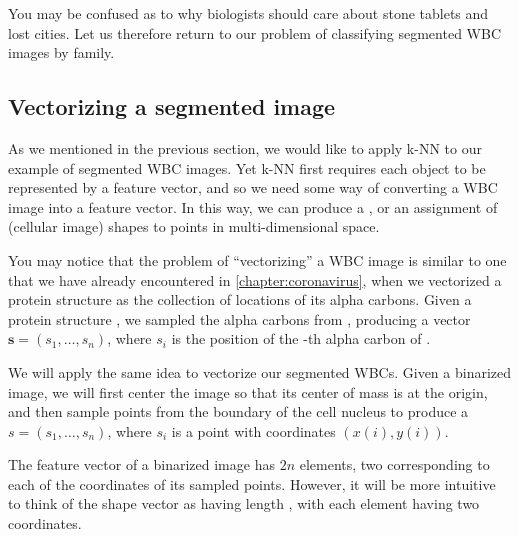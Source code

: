 You may be confused as to why biologists should care about stone tablets and lost cities. Let us therefore return to our problem of classifying segmented WBC images by family.

\FloatBarrier
{}
\subsection{Vectorizing a segmented image}

As we mentioned in the previous section, we would like to apply k-NN to our example of segmented WBC images. Yet k-NN first requires each object to be represented by a feature vector, and so we need some way of converting a WBC image into a feature vector. In this way, we can produce a , or an assignment of (cellular image) shapes to points in multi-dimensional space.

You may notice that the problem of ``vectorizing'' a WBC image is similar to one that we have already encountered in \autoref{chapter:coronavirus}, when we vectorized a protein structure as the collection of locations of its alpha carbons. Given a protein structure , we sampled the  alpha carbons from , producing a vector $\mathbf{s} = (s_1, \ldots, s_n)$, where $s_i$ is the position of the -th alpha carbon of .

We will apply the same idea to vectorize our segmented WBCs. Given a binarized image, we will first center the image so that its center of mass is at the origin, and then sample  points from the boundary of the cell nucleus to produce a  $s = (s_1, \ldots, s_n)$, where $s_i$ is a point with coordinates $(x(i), y(i))$.\\

\begin{note}\end{note}

The feature vector of a binarized image has $2n$ elements, two corresponding to each of the coordinates of its  sampled points. However, it will be more intuitive to think of the shape vector as having length , with each element having two coordinates.

